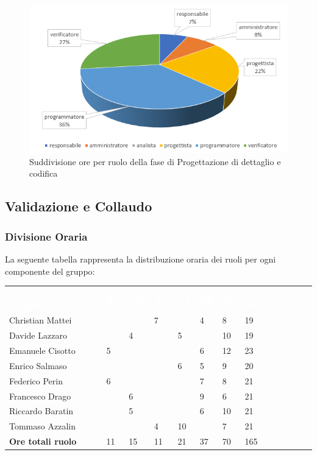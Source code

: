 \begin{figure}[h]
	\centering
	\caption{Suddivisione ore per ruolo della fase di Progettazione di dettaglio e codifica}
	\includegraphics[scale=2]{sezioni/Aerogrammi/AerogrammaDiDettaglio.png}
\end{figure}

\clearpage
\subsection{Validazione e Collaudo}

\subsubsection{Divisione Oraria}
La seguente tabella rappresenta la distribuzione oraria dei ruoli per ogni componente del gruppo:
{
	\renewcommand{\arraystretch}{2}
	\centering
\begin{table}[h]
		\caption{Tabella della divisione oraria di Validazione e Collaudo}
	\begin{longtable}{ C{5cm} C{1cm} C{1cm} C{1cm} C{1cm} C{1cm} C{1cm} C{3cm}}
		\textcolor{white}{\textbf{Nome membro del gruppo}} & \textcolor{white}{\textbf{RE}} & \textcolor{white}{\textbf{AM}} & \textcolor{white}{\textbf{AN}} & \textcolor{white}{\textbf{PT}} & \textcolor{white}{\textbf{PR}} & \textcolor{white}{\textbf{VE}} & \textcolor{white}{\textbf{Ore complessive}}\\	
        
        Christian Mattei & & & 7 & & 4 & 8 & 19\\
        Davide Lazzaro & & 4 & & 5 & & 10 & 19\\
        Emanuele Cisotto & 5 & & & & 6 & 12 & 23\\ 
        Enrico Salmaso & & & & 6 & 5 & 9 & 20 \\
        Federico Perin & 6 & & & & 7 & 8 & 21\\
        Francesco Drago & & 6 & & & 9 & 6 & 21\\
        Riccardo Baratin & & 5 & & & 6 & 10 & 21\\
        Tommaso Azzalin & & & 4 & 10 & & 7 & 21\\
        \textbf{Ore totali ruolo} & 11 & 15 & 11 & 21 & 37 & 70 & 165\\
		
	\end{longtable}
\end{table}
}


